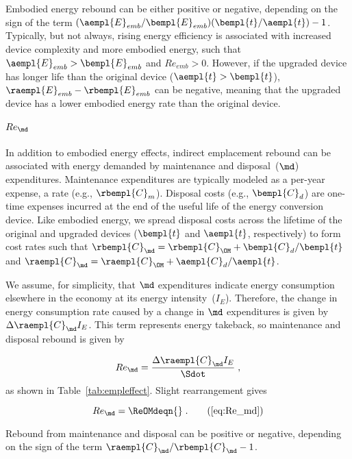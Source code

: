 Embodied energy rebound can be either positive or negative, depending on 
the sign of the term
$(\aempl{E}_{emb}/\bempl{E}_{emb})(\bempl{t}/\aempl{t}) - 1$.
Typically, but not always,
rising energy efficiency is associated with increased device complexity
and more embodied energy,
such that $\aempl{E}_{emb} > \bempl{E}_{emb}$ and $Re_{emb} > 0$.
However, if the upgraded device has longer life than the original device
($\aempl{t} > \bempl{t}$),
$\raempl{E}_{emb} - \rbempl{E}_{emb}$ can be negative,
meaning that the upgraded device has a lower embodied energy rate than the original device.


\paragraph{$Re_{\md}$} 
\label{sec:Re_OMd}

In addition to embodied energy effects, 
indirect emplacement rebound 
can be associated with energy demanded by maintenance and disposal~($\md$) expenditures.
Maintenance expenditures are typically modeled as a per-year expense, 
a rate (e.g., $\rbempl{C}_m$).
Disposal costs (e.g., $\bempl{C}_d$) are one-time expenses incurred at the end of the useful life of the energy conversion device.
Like embodied energy, we spread disposal costs across the lifetime 
of the original and upgraded devices ($\bempl{t}$ and $\aempl{t}$, respectively)
to form cost rates such that $\rbempl{C}_{\md} = \rbempl{C}_{\OM} + \bempl{C}_d/\bempl{t}$
and
$\raempl{C}_{\md} = \raempl{C}_{\OM} + \aempl{C}_d/\aempl{t}$.

We assume, for simplicity, that $\md$ expenditures indicate energy consumption
elsewhere in the economy at its energy intensity~($I_E$).
Therefore, the change in energy consumption rate caused by a change in $\md$ expenditures
is given by $\Delta \raempl{C}_{\md} I_E$.
This term represents energy takeback, so maintenance and disposal rebound is given by

\begin{equation} \label{eq:Re_md_def}
  Re_{\md} = \frac{\Delta \raempl{C}_{\md} I_E}{\Sdot} \; ,
\end{equation}
%
as shown in Table~\ref{tab:empleffect}.
Slight rearrangement gives

\begin{equation}
  Re_{\md} = \ReOMdeqn{} \; . \tag{\ref{eq:Re_md}}
\end{equation}

Rebound from maintenance and disposal can be positive or negative,
depending on the sign of the term $\raempl{C}_{\md}/\rbempl{C}_{\md} - 1$.


